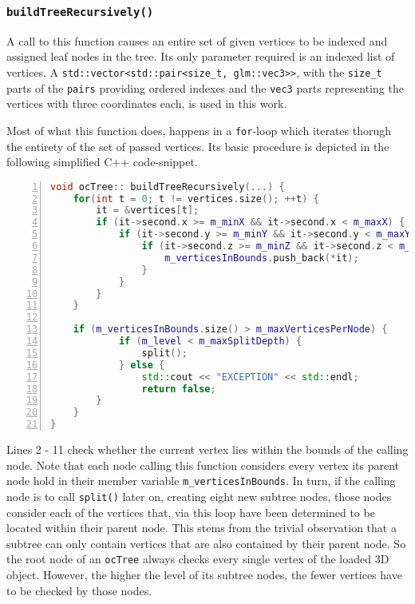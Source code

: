 	\subsubsection{\texttt{buildTreeRecursively()}}
	\label{sec:buildTreeRecursively}
A call to this function causes an entire set of given vertices to be indexed and assigned leaf nodes in the tree. Its only parameter required is an indexed list of vertices. A \texttt{std::vector<std::pair<size\_t, glm::vec3>>}, with the \texttt{size\_t} parts of the \texttt{pairs} providing ordered indexes and the \texttt{vec3} parts representing the vertices with three coordinates each, is used in this work.

	Most of what this function does, happens in a \texttt{for}-loop which iterates thorugh the entirety of the set of passed vertices. Its basic procedure is depicted in the following simplified C++ code-snippet.

\begin{minipage}{\linewidth}
\begin{lstlisting}[language=C++,numberstyle=\zebra{black!5}{white}{},numbers=left,xleftmargin=2em,tabsize=3]
void ocTree:: buildTreeRecursively(...) {
	for(int t = 0; t != vertices.size(); ++t) {
		it = &vertices[t];
		if (it->second.x >= m_minX && it->second.x < m_maxX) {
			if (it->second.y >= m_minY && it->second.y < m_maxY) {
				if (it->second.z >= m_minZ && it->second.z < m_maxZ) {
					m_verticesInBounds.push_back(*it);
				}
			}
		}
	}

	if (m_verticesInBounds.size() > m_maxVerticesPerNode) {
			if (m_level < m_maxSplitDepth) {
				split();
			} else {
				std::cout << "EXCEPTION" << std::endl;
				return false;
		}
	}
}
\end{lstlisting}
\end{minipage}

Lines 2 - 11 check whether the current vertex lies within the bounds of the calling node. Note that each node calling this function considers every vertex its parent node hold in their member variable \texttt{m\_verticesInBounds}. In turn, if the calling node is to call \texttt{split()} later on, creating eight new subtree nodes, those nodes consider each of the vertices that, via this loop have been determined to be located within their parent node. This stems from the trivial observation that a subtree can only contain vertices that are also contained by their parent node. So the root node of an \texttt{ocTree} always checks every single vertex of the loaded 3D object. However, the higher the level of its subtree nodes, the fewer vertices have to be checked by those nodes.

